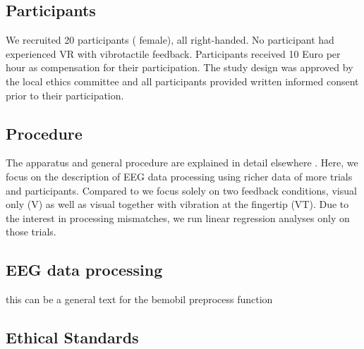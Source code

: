 \subsection{Participants}
We recruited 20 participants ( female), all right-handed. No participant had experienced VR with vibrotactile feedback. Participants received 10 Euro per hour as compensation for their participation. The study design was approved by the local ethics committee and all participants provided written informed consent prior to their participation. 

\subsection{Procedure}
The apparatus and general procedure are explained in detail elsewhere \citep{Gehrke_2019}. Here, we focus on the description of EEG data processing using richer data of more trials and participants. Compared to \citep{Gehrke_2019} we focus solely on two feedback conditions, visual only (V) as well as visual together with vibration at the fingertip (VT). Due to the interest in processing mismatches, we run linear regression analyses only on those trials.

\subsection{EEG data processing}

this can be a general text for the bemobil preprocess function

\subsection{Ethical Standards}
